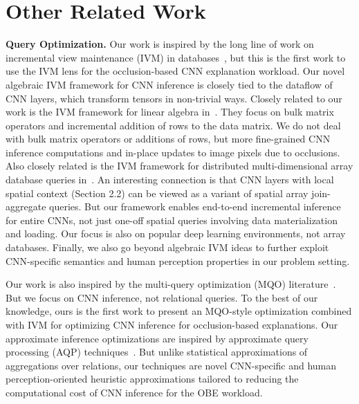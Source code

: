 \documentclass[10pt, sigconf]{acmart}
\begin{document}


\section{Other Related Work}

\vspace{2mm}
\noindent \textbf{Query Optimization.} 
Our work is inspired by the long line of work on incremental view maintenance (IVM) in databases~\cite{chirkova2012materialized, gupta1995maintenance, levy1995answering}, but this is the first work to use the IVM lens for the occlusion-based CNN explanation workload. Our novel algebraic IVM framework for CNN inference is closely tied to the dataflow of CNN layers, which transform tensors in non-trivial ways. Closely related to our work is the IVM framework for linear algebra in~\cite{nikolic2014linview}. They focus on bulk matrix operators and incremental addition of rows to the data matrix. We do not deal with bulk matrix operators or additions of rows, but more fine-grained CNN inference computations and in-place updates to image pixels due to occlusions. Also closely related is the IVM framework for distributed multi-dimensional array database queries in~\cite{zhao2017incremental}. An interesting connection is that CNN layers with local spatial context (Section 2.2) can be viewed as a variant of spatial array join-aggregate queries. But our framework enables end-to-end incremental inference for entire CNNs, not just one-off spatial queries involving data materialization and loading. Our focus is also on popular deep learning environments, not array databases. Finally, we also go beyond algebraic IVM ideas to further exploit CNN-specific semantics and human perception properties in our problem setting.

Our work is also inspired by the multi-query optimization (MQO) literature~\cite{sellis1988multiple,le2012scalable}. But we focus on CNN inference, not relational queries. To the best of our knowledge, ours is the first work to present an MQO-style optimization combined with IVM for optimizing CNN inference for occlusion-based explanations.
Our approximate inference optimizations are inspired by approximate query processing (AQP) techniques~\cite{park2018verdictdb,garofalakis2001approximate}. But unlike statistical approximations of aggregations over relations, our techniques are novel CNN-specific and human perception-oriented heuristic approximations tailored to reducing the computational cost of CNN inference for the OBE workload.
\end{document}
